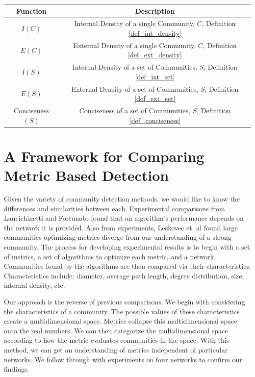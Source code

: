 \documentclass[phd,tocprelim]{cornell}
\renewcommand{\caption}[1]{\singlespacing\hangcaption{#1}\normalspacing}
\begin{document}
\begin{table}
\caption{Introduced Functions}
\begin{center}
\begin{tabular}{|c|c|} \hline
Function & Description \\ \hline
$I(C)$ & Internal Density of a single Community, $C$, Definition \ref{def_int_density} \\ \hline
$E(C)$ & External Density of a single Community, $C$, Definition  \ref{def_ext_density} \\ \hline
$I(S)$ & Internal Density of a set of Communities, $S$, Definition \ref{def_int_set} \\ \hline
$E(S)$ & External Density of a set of Communities, $S$, Definition \ref{def_ext_set} \\ \hline
{\sc Conciseness}$(S)$ & Conciseness of a set of Communities, $S$, Definition \ref{def_conciseness} \\ \hline
\end{tabular}
\end{center}
\label{table_new_functions}
\end{table}





\chapter{A Framework for Comparing  Metric Based Detection}
Given the variety of community detection methods, we would like to know the differences and similarities between each.  Experimental comparisons from Lancichinetti and Fortunato \cite{lanc:2009} found that an algorithm's performance depends on the network it is provided.  Also from experiments, Leskovec et. al \cite{leskovec} found large communities optimizing metrics diverge from our understanding of a strong community.  The process for developing experimental results is to begin with a set of metrics, a set of algorithms to optimize each metric, and a network.  Communities found by the algorithms are then compared via their characteristics.  Characteristics include: diameter, average path length, degree distribution, size, internal density, etc.

Our approach is the reverse of previous comparisons.  We begin with considering the characteristics of a community.  The possible values of these characteristics create a multidimensional space.  Metrics collapse this multidimensional space onto the real numbers.  We can then categorize the multidimensional space according to how the metric evaluates communities in the space.  With this method, we can get an understanding of metrics independent of particular networks.  We follow through with experiments on four networks to confirm our findings.
\end{document}
